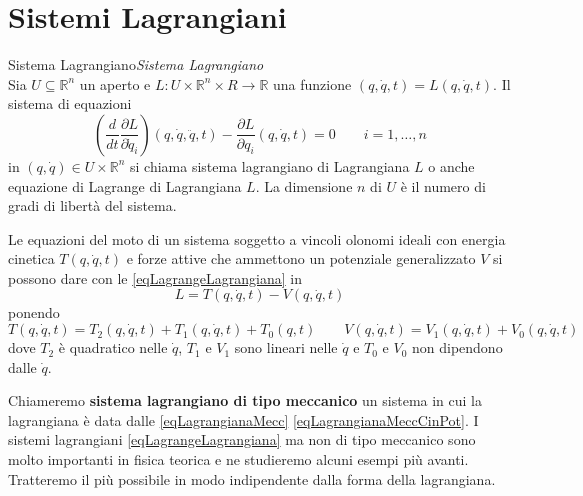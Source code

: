 \documentclass[11pt,a4paper,twoside]{book}
\newenvironment{definizione}[1][\empty]{\begin{Definizione}{
\ifx\empty#1\relax\else\mdseries\itshape#1\\\fi
}{}}{\end{Definizione}}
\newenvironment{importante}[0]{ 
  \begin{center}\begin{tcolorbox}[enhanced,
  before skip=2mm,after skip=3mm,
  boxrule=0.4pt,left=5mm,right=2mm,top=1mm,bottom=1mm,
  colback=yellow!50,
  colframe=yellow!20!black,
  sharp corners,arc=3mm,
  underlay={
  	\path[fill=red!50!black,draw=none] (interior.south west) rectangle 			node[white]{\Huge\bfseries !} ([xshift=4mm]interior.north west);
  },
  drop fuzzy shadow]
  }{
 \normalsize \end{tcolorbox}\end{center}
}
\theoremstyle{esss}
\theoremstyle{dotless}
\numberwithin{equation}{section} %
\begin{document}
\section{Sistemi Lagrangiani}
\begin{definizione}[Sistema Lagrangiano]
Sia $U\subseteq\mathbb{R}^n$ un aperto e $L:U\times\mathbb{R}^n\times R\rightarrow\mathbb{R}$ una funzione $(q,\dot{q},t)=L(q,\dot{q},t)$. Il sistema di equazioni
\begin{equation}\label{eqLagrangeLagrangiana}
\left(\dfrac{d}{dt}\dfrac{\partial L}{\partial \dot{q}_i}\right) (q,\dot{q},\ddot{q},t)-\dfrac{\partial L}{\partial q_i}(q,\dot{q},t)=0 \qquad i=1,\dots,n
\end{equation}
in $(q,\dot{q})\in U\times\mathbb{R}^n$ si chiama sistema lagrangiano di Lagrangiana $L$ o anche equazione di Lagrange di Lagrangiana $L$. 
La dimensione $n$ di $U$ è il numero di gradi di libertà del sistema.
\end{definizione}

\begin{importante}
Le equazioni del moto di un sistema soggetto a vincoli olonomi ideali con energia cinetica $T(q,\dot{q},t)$ e forze attive che ammettono un potenziale generalizzato $V$ si possono dare con le \eqref{eqLagrangeLagrangiana} in
\begin{equation}\label{eqLagrangianaMecc}
L=T(q,\dot{q},t)-V(q,\dot{q},t)
\end{equation}
ponendo
\begin{equation}\label{eqLagrangianaMeccCinPot}
T(q,\dot{q},t)=T_2(q,\dot{q},t)+T_1(q,\dot{q},t)+T_0(q,t) 
\qquad
V(q,\dot{q},t)=V_1(q,\dot{q},t) + V_0(q,\dot{q},t)
\end{equation}
dove $T_2$ è quadratico nelle $\dot{q}$, $T_1$ e $V_1$ sono lineari nelle $\dot{q}$ e $T_0$ e $V_0$ non dipendono dalle $\dot{q}$.
\end{importante}

Chiameremo \textbf{sistema lagrangiano di tipo meccanico} un sistema in cui la lagrangiana è data dalle \eqref{eqLagrangianaMecc} \eqref{eqLagrangianaMeccCinPot}.
I sistemi lagrangiani \eqref{eqLagrangeLagrangiana} ma non di tipo meccanico sono molto importanti in fisica teorica e ne studieremo alcuni esempi più avanti. Tratteremo il più possibile in modo indipendente dalla forma della lagrangiana.
\end{document}
